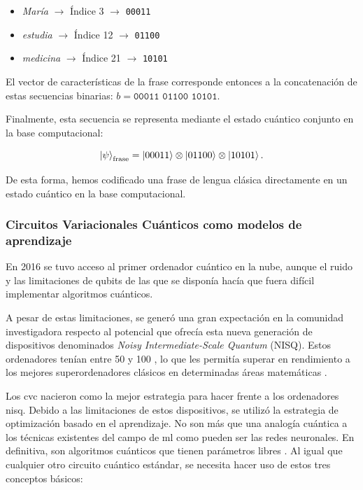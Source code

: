 \begin{itemize}
    \item \textit{María} $\rightarrow$ Índice 3 $\rightarrow$ \texttt{00011}
    \item \textit{estudia} $\rightarrow$ Índice 12 $\rightarrow$ \texttt{01100}
    \item \textit{medicina} $\rightarrow$ Índice 21 $\rightarrow$ \texttt{10101}
\end{itemize}

El vector de características de la frase corresponde entonces a la concatenación de estas secuencias binarias: $b = \texttt{00011 01100 10101}$.

Finalmente, esta secuencia se representa mediante el estado cuántico conjunto en la base computacional:

\[
    \ket{\psi}_{\text{frase}} = \ket{00011} \otimes \ket{01100} \otimes \ket{10101}.
\]

De esta forma, hemos codificado una frase de lengua clásica directamente en un estado cuántico en la base computacional.

\subsubsection{Circuitos Variacionales Cuánticos como modelos de aprendizaje}

En 2016 se tuvo acceso al primer ordenador cuántico en la nube, aunque el ruido y las limitaciones de qubits de las que se disponía hacía que fuera difícil implementar algoritmos cuánticos.

A pesar de estas limitaciones, se generó una gran expectación en la comunidad investigadora respecto al potencial que ofrecía esta nueva generación de dispositivos denominados \textit{Noisy Intermediate-Scale Quantum} (NISQ). Estos ordenadores tenían entre 50 y 100 , lo que les permitía superar en rendimiento a los mejores superordenadores clásicos en determinadas áreas matemáticas \cite{arute2019quantum,zhong2020quantum}.

Los \gls{cvc} nacieron como la mejor estrategia para hacer frente a los ordenadores \gls{nisq}. Debido a las limitaciones de estos dispositivos, se utilizó la estrategia de optimización basado en el aprendizaje. No son más que una analogía cuántica a los técnicas existentes del campo de \gls{ml} como pueden ser las redes neuronales. En definitiva, son algoritmos cuánticos que tienen parámetros libres \cite{pennylane_variational_circuit}. Al igual que cualquier otro circuito cuántico estándar, se necesita hacer uso de estos tres conceptos básicos:

